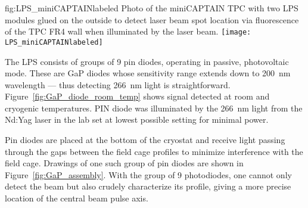 \begin{dunefigure}{fig:LPS_miniCAPTAINlabeled}
{Photo of the miniCAPTAIN TPC with two LPS modules glued on the outside to detect laser beam spot location via fluorescence of the TPC FR4 wall when illuminated by the laser beam.}
\texttt{[image: LPS\_miniCAPTAINlabeled]} 
\end{dunefigure}

The LPS consists of groups of \num{9} pin diodes, operating in passive, photovoltaic mode. These are GaP diodes whose sensitivity range extends down to  \SI{200}{\nano\m} wavelength --- thus detecting \SI{266}{\nano\m} light is straightforward. Figure~\ref{fig:GaP_diode_room_temp} shows signal detected at room and cryogenic temperatures. PIN diode was illuminated by the \SI{266}{\nano\m} light from the Nd:Yag
laser in the lab 
set at lowest possible setting for minimal power. 

Pin diodes are placed at the bottom of the cryostat and receive light passing through the gaps between the field cage profiles to minimize interference with the field cage. Drawings of one such group of pin diodes are shown in Figure~\ref{fig:GaP_assembly}. With the group of \num{9} photodiodes, one cannot only detect the beam but also crudely characterize its profile, giving a more precise location of the central beam pulse axis.




